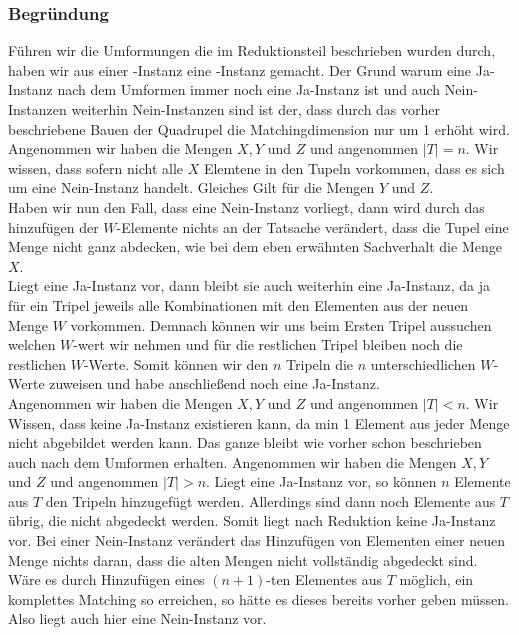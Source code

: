 \documentclass[a4paper]{article}
\begin{document}
			\subsubsection*{Begründung}
			Führen wir die Umformungen die im Reduktionsteil beschrieben wurden durch, haben wir aus einer \threedmatching-Instanz eine \fourdmatching-Instanz gemacht. Der Grund warum eine Ja-Instanz nach dem Umformen immer noch eine Ja-Instanz ist und auch Nein-Instanzen weiterhin Nein-Instanzen sind ist der, dass durch das vorher beschriebene Bauen der Quadrupel die Matchingdimension nur um 1 erhöht wird.\n
			Angenommen wir haben die Mengen $X,Y$ und $Z$ und angenommen $|T| = n$. Wir wissen, dass sofern nicht alle $X$ Elemtene in den Tupeln vorkommen, dass es sich um eine Nein-Instanz handelt. Gleiches Gilt für die Mengen $Y$ und $Z$.\\
			Haben wir nun den Fall, dass eine Nein-Instanz vorliegt, dann wird durch das hinzufügen der $W$-Elemente nichts an der Tatsache verändert, dass die Tupel eine Menge nicht ganz abdecken, wie bei dem eben erwähnten Sachverhalt die Menge $X$.\\
			Liegt eine Ja-Instanz vor, dann bleibt sie auch weiterhin eine Ja-Instanz, da ja für ein Tripel jeweils alle Kombinationen mit den Elementen aus der neuen Menge $W$ vorkommen. Demnach können wir uns beim Ersten Tripel aussuchen welchen $W$-wert wir nehmen und für die restlichen Tripel bleiben noch die restlichen $W$-Werte. Somit können wir den $n$ Tripeln die $n$ unterschiedlichen $W$-Werte zuweisen und habe anschließend noch eine Ja-Instanz.\\
			Angenommen wir haben die Mengen $X,Y$ und $Z$ und angenommen $|T| < n$. Wir Wissen, dass keine Ja-Instanz existieren kann, da min 1 Element aus jeder Menge nicht abgebildet werden kann. Das ganze bleibt wie vorher schon beschrieben auch nach dem Umformen erhalten.\n
			Angenommen wir haben die Mengen $X,Y$ und $Z$ und angenommen $|T| > n$.
			Liegt eine Ja-Instanz vor, so können $n$ Elemente aus $T$ den Tripeln hinzugefügt werden. Allerdings sind dann noch Elemente aus $T$ übrig, die nicht abgedeckt werden. Somit liegt nach Reduktion keine Ja-Instanz vor.
			Bei einer Nein-Instanz verändert das Hinzufügen von Elementen einer neuen Menge nichts daran, dass die alten Mengen nicht vollständig abgedeckt sind. Wäre es durch Hinzufügen eines $(n+1)$-ten Elementes aus $T$ möglich, ein komplettes Matching so erreichen, so hätte es dieses bereits vorher geben müssen. Also liegt auch hier eine Nein-Instanz vor.
\end{document}
